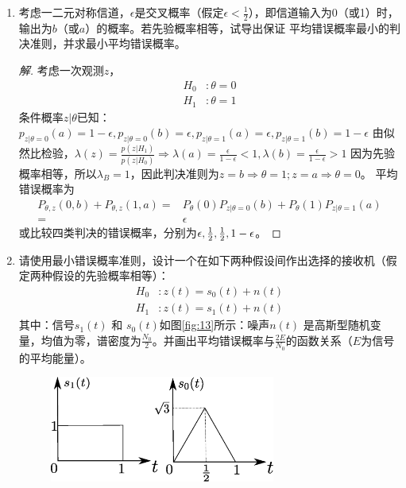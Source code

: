 \documentclass{article}
\begin{document}
\begin{enumerate}
\begin{enumerate}[label=(\arabic*)]
\begin{proof}[解]
\begin{align*}
\mathcal{Z}_1 = & \{z|\lambda(z) > \lambda_B\}
\end{align*}
\begin{align*}
P_F = P(D_1,H_0) = & \int_{z\in \mathcal{Z}_1} p(z|H_0)dz \\
P_M = P(D_0,H_1) = & \int_{z\in \mathcal{Z}_0} p(z|H_1)dz 
\end{align*}
Discuss $\sigma_1 \gtreqless \sigma_0,m_1\gtreqless m_0$.
\end{proof}
\item 考虑一二元对称信道，$\epsilon$是交叉概率（假定$\epsilon< \frac{1}{2}$），即信道输入为0（或1）时，输出为$b$（或$a$）的概率。若先验概率相等，试导出保证
平均错误概率最小的判决准则，并求最小平均错误概率。
\begin{proof}[解]
考虑一次观测$z$，
\begin{align*}
H_0 & :  \theta = 0 \\
H_1 & :  \theta = 1
\end{align*}
条件概率$z|\theta$已知：$p_{z|\theta=0}(a)=1-\epsilon,p_{z|\theta=0}(b)=\epsilon,p_{z|\theta=1}(a)=\epsilon,p_{z|\theta=1}(b)=1-\epsilon$
由似然比检验，$\lambda(z)=\frac{p(z|H_1)}{p(z|H_0)}\Rightarrow \lambda(a)=\frac{\epsilon}{1-\epsilon}<1,\lambda(b)=\frac{\epsilon}{1-\epsilon}>1$
因为先验概率相等，所以$\lambda_B=1$，因此判决准则为$z=b \Rightarrow \theta=1; z=a\Rightarrow \theta=0$。
平均错误概率为
\begin{align*}
P_{\theta,z}(0,b)+P_{\theta,z}(1,a)= & P_{\theta}(0) P_{z|\theta=0}(b) + P_{\theta}(1) P_{z|\theta=1}(a) \\
                                 = & \epsilon 
\end{align*}
或比较四类判决的错误概率，分别为$\epsilon,{1\over 2},{1\over 2},1-\epsilon$。
\end{proof}
\item 请使用最小错误概率准则，设计一个在如下两种假设间作出选择的接收机（假定两种假设的先验概率相等）：
\begin{align*}
H_0 & :  z(t) = s_0(t) + n(t) \\
H_1 & :  z(t) = s_1(t) + n(t)
\end{align*}
其中：信号$s_1(t)$ 和 $s_0(t)$如图\ref{fig:13}所示：噪声$n(t)$ 是高斯型随机变量，均值为零，谱密度为$\frac{N_0}{2}$。并画出平均错误概率与$\frac{2E}{N_0}$的函数关系（$E$为信号的平均能量）。
\begin{figure}[!ht]
\centering
\includegraphics[width=0.7\textwidth]{practice_13.eps}

\end{figure}
\end{enumerate}
\end{enumerate}
\end{document}

